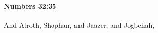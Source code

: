 
		\paragraph{Numbers 32:35} %
			\label{NUMBERS-32-35}

			And Atroth, Shophan, and Jaazer, and Jogbehah,


